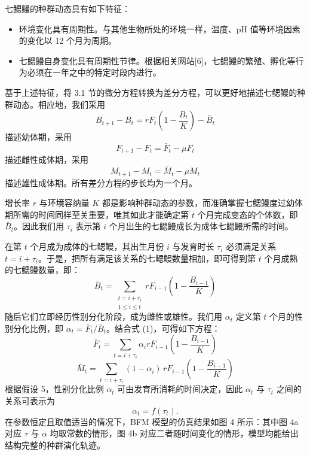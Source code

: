 \documentclass[11pt,a4paper]{ctexart}
\begin{document}
七鳃鳗的种群动态具有如下特征：

\begin{itemize}
\item 环境变化具有周期性。与其他生物所处的环境一样，温度、pH 值等环境因素的变化以 12 个月为周期。
\item 七鳃鳗自身变化具有周期性节律。根据相关网站[6]，七鳃鳗的繁殖、孵化等行为必须在一年之中的特定时段内进行。
\end{itemize}

基于上述特征，将 3.1 节的微分方程转换为差分方程，可以更好地描述七鳃鳗的种群动态。相应地，我们采用
\begin{equation}
B_{t+1}-B_t=rF_t\left(1-\frac{B_t}{K}\right)-\bar B_t \tag{2}
\end{equation}
描述幼体期，采用
\begin{equation}
F_{t+1}-F_t=\bar F_t-\mu F_t \tag{3}
\end{equation}
描述雌性成体期，采用
\begin{equation}
M_{t+1}-M_t=\bar M_t-\mu M_t \tag{4}
\end{equation}
描述雄性成体期。所有差分方程的步长均为一个月。

增长率 $r$ 与环境容纳量 $K$ 都是影响种群动态的参数，而准确掌握七鳃鳗度过幼体期所需的时间同样至关重要，唯其如此才能确定第 $t$ 个月完成变态的个体数，即 $\bar B_t$。因此我们用 $\tau_i$ 表示第 $i$ 个月出生的七鳃鳗成长为成体七鳃鳗所需的时间。

在第 $t$ 个月成为成体的七鳃鳗，其出生月份 $i$ 与发育时长 $\tau_i$ 必须满足关系 $t=i+\tau_i$。于是，把所有满足该关系的七鳃鳗数量相加，即可得到第 $t$ 个月成熟的七鳃鳗数量，即：
\begin{equation}
\bar B_t=\sum_{\substack{t=i+\tau_i\\ 1\leqslant i\leqslant t}} rF_{i-1}\left(1-\frac{B_{i-1}}{K}\right) \tag{5}
\end{equation}
随后它们立即经历性别分化阶段，成为雌性或雄性。我们用 $\alpha_t$ 定义第 $t$ 个月的性别分化比例，即 $\alpha_t=\bar F_t/\bar B_t$。结合式 (1)，可得如下方程：
\begin{equation}
\bar F_t=\sum_{t=i+\tau_i}\alpha_i rF_{i-1}\left(1-\frac{B_{i-1}}{K}\right) \tag{6}
\end{equation}
\begin{equation}
\bar M_t=\sum_{t=i+\tau_i}(1-\alpha_i)\,rF_{i-1}\left(1-\frac{B_{i-1}}{K}\right) \tag{7}
\end{equation}
根据假设 5，性别分化比例 $\alpha_t$ 可由发育所消耗的时间决定，因此 $\alpha_t$ 与 $\tau_t$ 之间的关系可表示为
\[
\alpha_t=f(\tau_t).
\]
在参数恒定且取值适当的情况下，BFM 模型的仿真结果如图 4 所示：其中图 4a 对应 $\tau$ 与 $\alpha$ 均取常数的情形，图 4b 对应二者随时间变化的情形，模型均能给出结构完整的种群演化轨迹。
\end{document}
